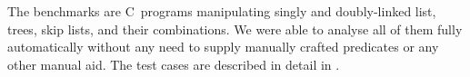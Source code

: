 {The benchmarks are C~programs manipulating singly and doubly-linked list, trees, skip lists, and their combinations.
We were able to analyse all of them fully automatically without any need to supply
manually crafted predicates or any other manual aid. The test cases are described in
detail in .



}
